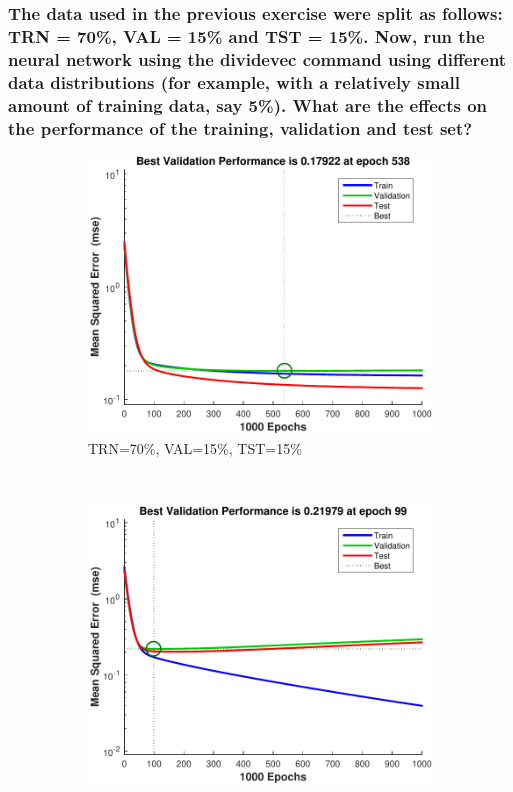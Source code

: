 \documentclass[12pt, a4paper]{article}
\begin{document}
\subsubsection{The data used in the previous exercise were split as follows: TRN = 70\%, VAL = 15\% and TST = 15\%. Now, run the neural network using the dividevec command using different data distributions (for example, with a relatively small amount of training data, say 5\%). What are the effects on the performance of the training, validation and test set?}
\begin{figure}[htbp]
		\centering
		\begin{subfigure}[b]{0.42\textwidth}
			\includegraphics[width=\textwidth]{Q5-70}
			\caption{TRN=70\%, VAL=15\%, TST=15\%}
			\label{Q5-repr}
		\end{subfigure}
		~
		\begin{subfigure}[b]{0.42\textwidth}
			\includegraphics[width=\textwidth]{Q5-non-repr-training}

\end{subfigure}
\end{figure}
\end{document}

